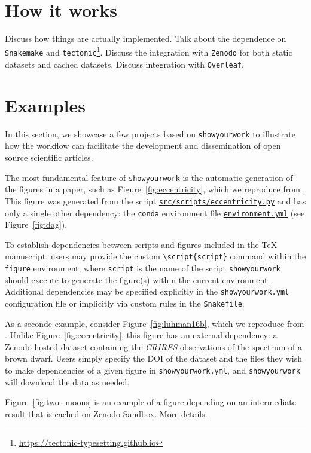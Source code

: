 \documentclass{aastex631}
\newcommand\xxx[1]{{\color{red}#1}}
\newcommand\syw{\texttt{showyourwork}\xspace}
\newcommand\repourl{https://github.com/showyourwork/showyourwork-paper}
\newcommand\fileurl[1]{\repourl/blob/\GitHubSHA/#1}
\begin{document}
\section{How it works}
\label{sec:how-it-works}
\xxx{Discuss how things are actually implemented. Talk about the dependence on \texttt{Snakemake} \citep{Molder2021} and \texttt{tectonic}\footnote{\url{https://tectonic-typesetting.github.io}}. Discuss the integration with \texttt{Zenodo} for both static datasets and cached datasets. Discuss integration with \texttt{Overleaf}.}

\section{Examples}
\label{sec:examples}
In this section, we showcase a few projects based on \syw to illustrate how the workflow can facilitate the development and dissemination of open source scientific articles.

The most fundamental feature of \syw is the automatic generation of the figures in a paper, such as Figure~\ref{fig:eccentricity}, which we reproduce from \citet{Wagg2022}.
This figure was generated from the script \href{\fileurl{src/scripts/eccentricity.py}}{\texttt{src/scripts/eccentricity.py}} and has only a single other dependency: the \texttt{conda} environment file \href{\fileurl{environment.yml}}{\texttt{environment.yml}} (see Figure~\ref{fig:dag}).

To establish dependencies between scripts and figures included in the TeX manuscript, users may provide the custom \texttt{\textbackslash script\{{\color{lsthilite}script}\}} command within the \texttt{figure} environment, where \texttt{\color{lsthilite}script} is the name of the script \syw should execute to generate the figure(s) within the current environment.
Additional dependencies may be specified explicitly in the \texttt{showyourwork.yml} configuration file or implicitly via custom rules in the \texttt{Snakefile}.

As a seconde example, consider Figure~\ref{fig:luhman16b}, which we reproduce from \citet{Luger2021c}. 
Unlike Figure~\ref{fig:eccentricity}, this figure has an external dependency: a Zenodo-hosted dataset containing the \emph{CRIRES} observations of the spectrum of a brown dwarf.
Users simply specify the DOI of the dataset and the files they wish to make dependencies of a given figure in \texttt{showyourwork.yml}, and \syw will download the data as needed.

Figure~\ref{fig:two_moons} is an example of a figure depending on an intermediate result that is cached on Zenodo Sandbox.
\xxx{More details.}
\end{document}
